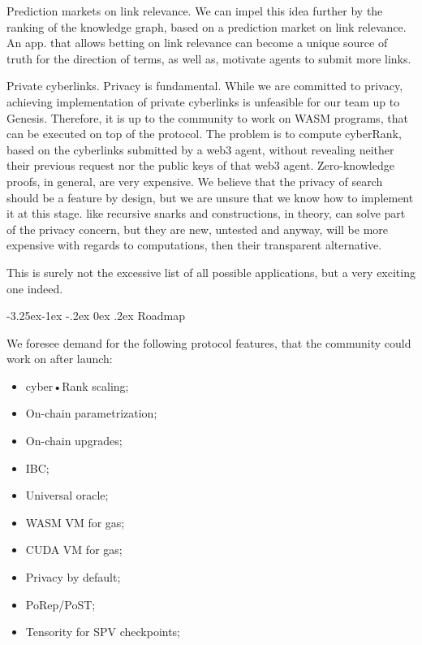 \documentclass[8pt,oneside]{amsart}
\makeatletter
\newcommand{\linkgreen}[2]{\href{#1}{\color{green}{#2}}}
\renewcommand\subsection{\@startsection{subsection}{2}{\z@}%
                                     {-3.25ex\@plus -1ex \@minus -.2ex}%
                                     {0ex \@plus .2ex}%
                                     {\play\Large}}%
\newcommand{\titleSection}[1]{\subsection{#1}}
\newcommand{\code}[1]{{\PlayBold #1}}
\makeatother
\begin{document}
\begin{Abstract}
\code{Prediction markets on link relevance}. We can impel this idea further by the ranking of the knowledge graph, based on a prediction market on link relevance. An app. that allows betting on link relevance can become a unique source of truth for the direction of terms, as well as, motivate agents to submit more links.

\code{Private cyberlinks}. Privacy is fundamental. While we are committed to privacy, achieving implementation of private cyberlinks is unfeasible for our team up to Genesis. Therefore, it is up to the community to work on WASM programs, that can be executed on top of the protocol. The problem is to compute cyberRank, based on the cyberlinks submitted by a web3 agent, without revealing neither their previous request nor the public keys of that web3 agent. Zero-knowledge proofs, in general, are very expensive. We believe that the privacy of search should be a feature by design, but we are unsure that we know how to implement it at this stage. \linkgreen{https://ipfs.io/ipfs/Qmdje3AmtsfjX9edWAxo3LFhV9CTAXoUvwGR7wHJXnc2Gk}{Coda} like recursive snarks and \linkgreen{https://ipfs.io/ipfs/Qmd99xmraYip9cVv8gRMy6Y97Bkij8qUYArGDME7CzFasg}{mimblewimble} constructions, in theory, can solve part of the privacy concern, but they are new, untested and anyway, will be more expensive with regards to computations, then their transparent alternative.

This is surely not the excessive list of all possible applications, but a very exciting one indeed.

\titleSection{Roadmap}\label{Roadmap}

We foresee demand for the following protocol features, that the community could work on after launch:

\begin{itemize}
\item cyber•Rank scaling;
\item On-chain parametrization;
\item On-chain upgrades;
\item IBC;
\item Universal oracle;
\item WASM VM for gas;
\item CUDA VM for gas;
\item Privacy by default;
\item PoRep/PoST;
\item Tensority for SPV checkpoints;

\end{itemize}


\end{Abstract}
\end{document}
